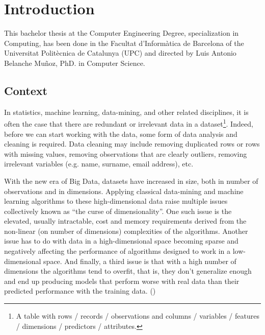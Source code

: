 
\chapter{Introduction} %

\label{Chapter1} %


This bachelor thesis at the Computer Engineering Degree, specialization in Com\-puting, has been done in the Facultat d’Informàtica de Barcelona of the Universitat Politècnica de Catalunya (UPC) and directed by Luis Antonio Belanche Muñoz, PhD. in Computer Science.

\section{Context}
\label{sec:context}

In statistics, machine learning, data-mining, and other related disciplines, it is often the case that there are redundant or irrelevant data in a dataset\footnote{A table with rows / records / observations and columns / variables / features / dimensions / predictors / attributes.}. Indeed, before we can start working with the data, some form of data analysis and cleaning is required. Data cleaning may include removing duplicated rows or rows with missing values, removing observations that are clearly outliers, removing irrelevant variables (e.g. name, surname, email address), etc.

With the new era of Big Data, datasets have increased in size, both in number of observations and in dimensions. Applying classical data-mining and machine learning algorithms to these high-dimensional data raise multiple issues collectively known as “the curse of dimensionality”. One such issue is the elevated, usually intractable, cost and memory requirements derived from the non-linear (on number of dimensions) complexities of the algorithms. Another issue has to do with data in a high-dimensional space becoming sparse and negatively affecting the performance of algorithms designed to work in a low-dimensional space. And finally, a third issue is that with a high number of dimensions the algorithms tend to overfit, that is, they don't generalize enough and end up producing models that perform worse with real data than their predicted performance with the training data. (\cite{li_feature_2017})

